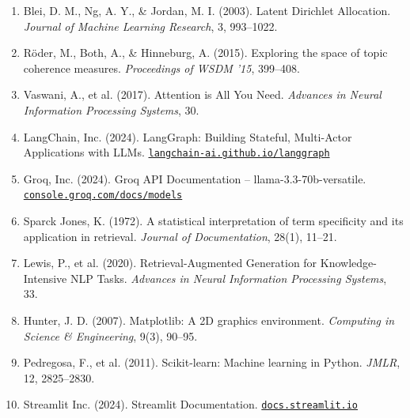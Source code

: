 \documentclass[12pt, a4paper]{article}
\begin{document}
\begin{enumerate}
  \item Blei, D. M., Ng, A. Y., \& Jordan, M. I. (2003). Latent Dirichlet Allocation. \textit{Journal of Machine Learning Research}, 3, 993--1022.
  \item Röder, M., Both, A., \& Hinneburg, A. (2015). Exploring the space of topic coherence measures. \textit{Proceedings of WSDM '15}, 399--408.
  \item Vaswani, A., et al. (2017). Attention is All You Need. \textit{Advances in Neural Information Processing Systems}, 30.
  \item LangChain, Inc. (2024). LangGraph: Building Stateful, Multi-Actor Applications with LLMs. \href{https://langchain-ai.github.io/langgraph/}{\texttt{langchain-ai.github.io/langgraph}}
  \item Groq, Inc. (2024). Groq API Documentation -- llama-3.3-70b-versatile. \href{https://console.groq.com/docs/models}{\texttt{console.groq.com/docs/models}}
  \item Sparck Jones, K. (1972). A statistical interpretation of term specificity and its application in retrieval. \textit{Journal of Documentation}, 28(1), 11--21.
  \item Lewis, P., et al. (2020). Retrieval-Augmented Generation for Knowledge-Intensive NLP Tasks. \textit{Advances in Neural Information Processing Systems}, 33.
  \item Hunter, J. D. (2007). Matplotlib: A 2D graphics environment. \textit{Computing in Science \& Engineering}, 9(3), 90--95.
  \item Pedregosa, F., et al. (2011). Scikit-learn: Machine learning in Python. \textit{JMLR}, 12, 2825--2830.
  \item Streamlit Inc. (2024). Streamlit Documentation. \href{https://docs.streamlit.io}{\texttt{docs.streamlit.io}}
\end{enumerate}
\end{document}

